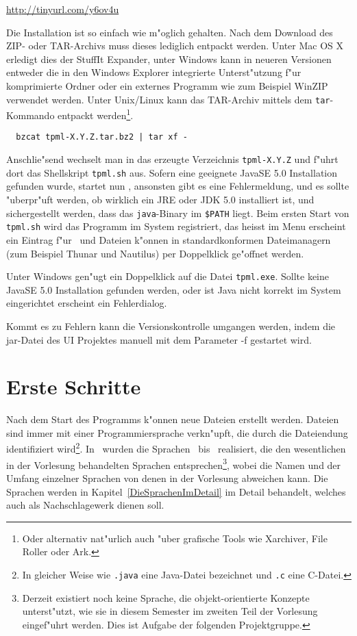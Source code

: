 \url{http://tinyurl.com/y6ov4u}

Die Installation ist so einfach wie m"oglich gehalten. Nach dem Download des ZIP- oder TAR-Archivs muss dieses
lediglich entpackt werden. Unter Mac OS X erledigt dies der StuffIt Expander, unter Windows kann in
neueren Versionen entweder die in den Windows Explorer integrierte Unterst"utzung f"ur komprimierte
Ordner oder ein externes Programm wie zum Beispiel WinZIP verwendet werden. Unter Unix/Linux kann
das TAR-Archiv mittels dem {\tt tar}-Kommando entpackt werden\footnote{Oder alternativ nat"urlich
auch "uber grafische Tools wie Xarchiver, File Roller oder Ark.}.
\begin{verbatim}
  bzcat tpml-X.Y.Z.tar.bz2 | tar xf -
\end{verbatim}
Anschlie"send wechselt man in das erzeugte Verzeichnis {\tt tpml-X.Y.Z} und f"uhrt dort das Shellskript
{\tt tpml.sh} aus. Sofern eine geeignete JavaSE 5.0 Installation gefunden wurde, startet nun \TPML,
ansonsten gibt es eine Fehlermeldung, und es sollte "uberpr"uft werden, ob wirklich ein JRE oder JDK
5.0 installiert ist, und sichergestellt werden, dass das {\tt java}-Binary im {\tt \$PATH} liegt. Beim
ersten Start von {\tt tpml.sh} wird das Programm im System registriert, das heisst im Menu erscheint
ein Eintrag f"ur \TPML\ und Dateien k"onnen in standardkonformen Dateimanagern (zum Beispiel Thunar
und Nautilus) per Doppelklick ge"offnet werden.

Unter Windows gen"ugt ein Doppelklick auf die Datei {\tt tpml.exe}. Sollte keine JavaSE 5.0
Installation gefunden werden, oder ist Java nicht korrekt im System eingerichtet erscheint
ein Fehlerdialog.

Kommt es zu Fehlern kann die Versionskontrolle umgangen werden, indem die jar-Datei des UI Projektes 
manuell mit dem Parameter -f gestartet wird.



\section{Erste Schritte}

Nach dem Start des Programms k"onnen neue Dateien erstellt werden. Dateien sind immer mit einer
Programmiersprache verkn"upft, die durch die Dateiendung identifiziert wird\footnote{In gleicher
Weise wie {\tt .java} eine Java-Datei bezeichnet und {\tt .c} eine C-Datei.}. In \TPML\ wurden
die Sprachen \LZERO\ bis \LFOUR\ realisiert, die den wesentlichen in der Vorlesung behandelten
Sprachen entsprechen\footnote{Derzeit existiert noch keine Sprache, die objekt-orientierte
Konzepte unterst"utzt, wie sie in diesem Semester im zweiten Teil der Vorlesung eingef"uhrt
werden. Dies ist Aufgabe der folgenden Projektgruppe.}, wobei die Namen und der Umfang
einzelner Sprachen von denen in der Vorlesung abweichen kann. Die Sprachen werden in
Kapitel~\ref{DieSprachenImDetail} im Detail behandelt, welches auch als Nachschlagewerk
dienen soll.

